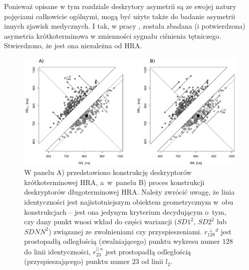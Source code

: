 Ponieważ opisane w tym rozdziale deskrytory asymetrii są ze swojej natury pojęciami
całkowicie ogólnymi, mogą być użyte także do badanie asymetrii innych zjawisk medycznych.
I tak, w pracy \cite{hypertension_asym}, została zbadana (i potwierdzona) asymetria krótkoterminowa w zmienności
sygnału ciśnienia tętniczego. Stwierdzono, że jest ona niezależna od HRA.
\begin{landscape}
\begin{figure}
\begin{center}
\includegraphics[width=1.5\textwidth]{graph/habfig2_2a}
\caption{W panelu A) przedstawiono konstrukcję deskryptorów krótkoterminowej HRA, a~w~panelu B) proces konstrukcji deskryptorów długoterminowej HRA. Należy zwrócić uwagę, że linia identyczności jest najistotniejszym obiektem geometrycznym w~obu konstrukcjach -- jest ona jedynym kryterium decydującym o~tym, czy dany punkt wnosi wkład do części wariancji ($SD1^2$, $SD2^2$ lub $SDNN^2$) związanej ze zwolnieniami czy przyspieszeniami. $r^{\perp\;d}_{128}$ jest prostopadłą odległością (zwalniającego) punktu wykresu \PP{} numer $128$ do linii identyczności, $r^{||\;a}_{23}$ jest prostopadłą odległością (przyspieszającego) punktu numer $23$ od linii $l_{2}$.\label{habfig2_2}}
\end{center}
\end{figure}
\end{landscape}
\clearpage
